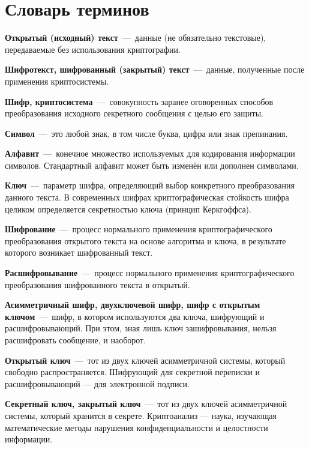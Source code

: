 \chapter*{Словарь терминов}             %

\textbf{Открытый (исходный) текст}~---~данные (не обязательно текстовые),
передаваемые без использования криптографии.

\textbf{Шифротекст, шифрованный (закрытый) текст}~---~данные, полученные
после применения криптосистемы.

\textbf{Шифр, криптосистема}~---~совокупность заранее оговоренных способов преобразования исходного секретного сообщения с целью его защиты.%

\textbf{Символ}~---~это любой знак, в том числе буква, цифра или знак
препинания.

\textbf{Алфавит}~---~конечное множество используемых для кодирования
информации символов. Стандартный алфавит может быть изменён или дополнен
символами.

\textbf{Ключ}~---~параметр шифра, определяющий выбор конкретного
преобразования данного текста. В современных шифрах криптографическая
стойкость шифра целиком определяется секретностью ключа (принцип Керкгоффса).

\textbf{Шифрование}~---~процесс нормального применения криптографического
преобразования открытого текста на основе алгоритма и ключа, в результате
которого возникает шифрованный текст.

\textbf{Расшифровывание}~---~процесс нормального применения
криптографического преобразования шифрованного текста в открытый.

\textbf{Асимметричный шифр, двухключевой шифр, шифр с открытым
ключом}~---~шифр, в котором используются два ключа, шифрующий и
расшифровывающий. При этом, зная лишь ключ зашифровывания, нельзя
расшифровать сообщение, и наоборот.

\textbf{Открытый ключ}~---~тот из двух ключей асимметричной системы, который
свободно распространяется. Шифрующий для секретной переписки и
расшифровывающий — для электронной подписи.

\textbf{Секретный ключ, закрытый ключ}~---~тот из двух ключей асимметричной
системы, который хранится в секрете. Криптоанализ — наука, изучающая
математические методы нарушения конфиденциальности и целостности информации.

